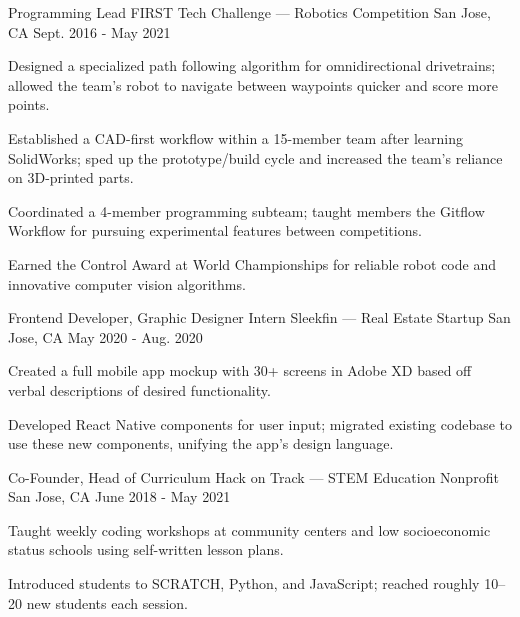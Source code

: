 
\begin{cventries}
  \cventry
  {Programming Lead} %
  {FIRST Tech Challenge --- Robotics Competition} %
  {San Jose, CA} %
  {Sept. 2016 - May 2021} %
  {
    \begin{cvitems} %
      \item {Designed a specialized path following algorithm for omnidirectional drivetrains; allowed the team's robot to navigate between waypoints quicker and score more points.}
      \item {Established a CAD-first workflow within a 15-member team after learning SolidWorks; sped up the prototype/build cycle and increased the team's reliance on 3D-printed parts.}
      \item {Coordinated a 4-member programming subteam; taught members the Gitflow Workflow for pursuing experimental features between competitions.}
      \item {Earned the Control Award at World Championships for reliable robot code and innovative computer vision algorithms.}
    \end{cvitems}
  }

  \cventry
  {Frontend Developer, Graphic Designer Intern} %
  {Sleekfin --- Real Estate Startup} %
  {San Jose, CA} %
  {May 2020 - Aug. 2020} %
  {
    \begin{cvitems} %
      \item {Created a full mobile app mockup with 30+ screens in Adobe XD based off verbal descriptions of desired functionality.}
      \item {Developed React Native components for user input; migrated existing codebase to use these new components, unifying the app's design language.}
    \end{cvitems}
  }

  \cventry
  {Co-Founder, Head of Curriculum} %
  {Hack on Track --- STEM Education Nonprofit} %
  {San Jose, CA} %
  {June 2018 - May 2021} %
  {
    \begin{cvitems} %
      \item {Taught weekly coding workshops at community centers and low socioeconomic status schools using self-written lesson plans.}
      \item {Introduced students to SCRATCH, Python, and JavaScript; reached roughly 10--20 new students each session.}
    \end{cvitems}
  }
\end{cventries}
